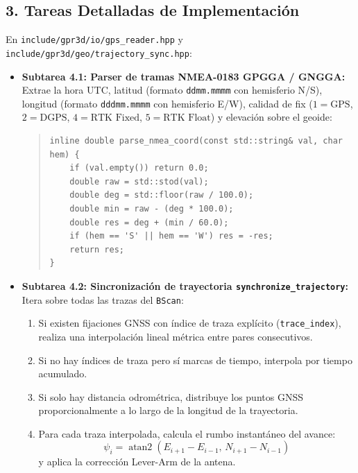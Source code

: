 \documentclass[11pt,a4paper]{article}
\begin{document}
\subsection{3. Tareas Detalladas de Implementación}
En \texttt{include/gpr3d/io/gps\_reader.hpp} y \texttt{include/gpr3d/geo/trajectory\_sync.hpp}:
\begin{itemize}
    \item \textbf{Subtarea 4.1: Parser de tramas NMEA-0183 GPGGA / GNGGA:}
    Extrae la hora UTC, latitud (formato \texttt{ddmm.mmmm} con hemisferio N/S), longitud (formato \texttt{dddmm.mmmm} con hemisferio E/W), calidad de fix ($1=\text{GPS}$, $2=\text{DGPS}$, $4=\text{RTK Fixed}$, $5=\text{RTK Float}$) y elevación sobre el geoide:
\begin{quote}
\small
\begin{verbatim}
inline double parse_nmea_coord(const std::string& val, char hem) {
    if (val.empty()) return 0.0;
    double raw = std::stod(val);
    double deg = std::floor(raw / 100.0);
    double min = raw - (deg * 100.0);
    double res = deg + (min / 60.0);
    if (hem == 'S' || hem == 'W') res = -res;
    return res;
}
\end{verbatim}
\end{quote}

    \item \textbf{Subtarea 4.2: Sincronización de trayectoria \texttt{synchronize\_trajectory}:}
    Itera sobre todas las trazas del \texttt{BScan}:
    \begin{enumerate}
        \item Si existen fijaciones GNSS con índice de traza explícito (\texttt{trace\_index}), realiza una interpolación lineal métrica entre pares consecutivos.
        \item Si no hay índices de traza pero sí marcas de tiempo, interpola por tiempo acumulado.
        \item Si solo hay distancia odrométrica, distribuye los puntos GNSS proporcionalmente a lo largo de la longitud de la trayectoria.
        \item Para cada traza interpolada, calcula el rumbo instantáneo del avance:
        \begin{equation}
            \psi_i = \operatorname{atan2}(E_{i+1} - E_{i-1}, \, N_{i+1} - N_{i-1})
        \end{equation}
        y aplica la corrección Lever-Arm de la antena.
    \end{enumerate}
\end{itemize}
\end{document}
